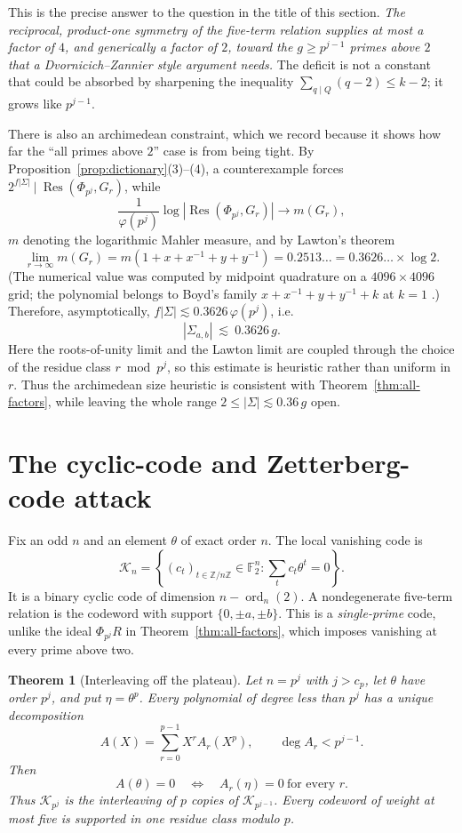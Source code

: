 \documentclass[a4paper]{article}
\newtheorem{theorem}{Theorem}[section]
\newcommand{\F}{\mathbb{F}}
\newcommand{\Z}{\mathbb{Z}}
\newcommand{\ord}[2][]{\operatorname{ord}_{#1}\!\left(#2\right)}
\newcommand{\abs}[1]{\left|#1\right|}
\DeclareMathOperator{\Res}{Res}
\begin{document}
This is the precise answer to the question in the title of this section.
\emph{The reciprocal, product-one symmetry of the five-term relation supplies
at most a factor of $4$, and generically a factor of $2$, toward the
$g\geq p^{j-1}$ primes above $2$ that a Dvornicich--Zannier style argument
needs.}
The deficit is not a constant that could be absorbed by sharpening the
inequality $\sum_{q\mid Q}(q-2)\leq k-2$; it grows like $p^{j-1}$.

There is also an archimedean constraint, which we record because it shows
how far the ``all primes above $2$'' case is from being tight.
By Proposition~\ref{prop:dictionary}(3)--(4),
a counterexample forces
$2^{f\abs{\Sigma}}\ \big|\ \Res(\Phi_{p^j},G_r)$, while
\[
	\frac{1}{\varphi(p^j)}\log\abs{\Res\!\left(\Phi_{p^j},G_r\right)}
	\longrightarrow
	m(G_r),
\]
$m$ denoting the logarithmic Mahler measure, and by Lawton's theorem
\cite{Lawton1983}
\[
	\lim_{r\to\infty}m(G_r)=m\!\left(1+x+x^{-1}+y+y^{-1}\right)=0.2513\ldots
	=0.3626\ldots\times\log2 .
\]
(The numerical value was computed by midpoint quadrature on a
$4096\times4096$ grid; the polynomial belongs to Boyd's family
$x+x^{-1}+y+y^{-1}+k$ at $k=1$ \cite{Boyd1998}.)
Therefore, asymptotically, $f\abs{\Sigma}\lesssim0.3626\,\varphi(p^j)$, i.e.
\[
	\abs{\Sigma_{a,b}}\ \lesssim\ 0.3626\,g .
\]
Here the roots-of-unity limit and the Lawton limit are coupled through the
choice of the residue class $r\bmod p^j$, so this estimate is heuristic rather
than uniform in $r$.
Thus the archimedean size heuristic is consistent with
Theorem~\ref{thm:all-factors}, while leaving the whole range
$2\leq\abs{\Sigma}\lesssim0.36\,g$ open.

\section{The cyclic-code and Zetterberg-code attack}\label{sec:coding}

Fix an odd $n$ and an element $\theta$ of exact order $n$.  The local
vanishing code is
\[
	\mathcal K_n
	=\left\{(c_t)_{t\in\Z/n\Z}\in\F_2^n:
		\sum_t c_t\theta^t=0\right\}.
\]
It is a binary cyclic code of dimension $n-\ord[n]{2}$.  A nondegenerate
five-term relation is the codeword with support
$\{0,\pm a,\pm b\}$.  This is a \emph{single-prime} code, unlike the ideal
$\Phi_{p^j}R$ in Theorem~\ref{thm:all-factors}, which imposes vanishing at
every prime above two.

\begin{theorem}[Interleaving off the plateau]\label{thm:code-interleaving}
	Let $n=p^j$ with $j>c_p$, let $\theta$ have order $p^j$, and put
	$\eta=\theta^p$.  Every polynomial of degree less than $p^j$ has a
	unique decomposition
	\[
		A(X)=\sum_{r=0}^{p-1}X^rA_r(X^p),
		\qquad \deg A_r<p^{j-1}.
	\]
	Then
	\[
		A(\theta)=0
		\quad\Longleftrightarrow\quad
		A_r(\eta)=0\ \text{for every }r.
	\]
	Thus $\mathcal K_{p^j}$ is the interleaving of $p$ copies of
	$\mathcal K_{p^{j-1}}$.  Every codeword of weight at most five is
	supported in one residue class modulo $p$.
\end{theorem}
\end{document}
